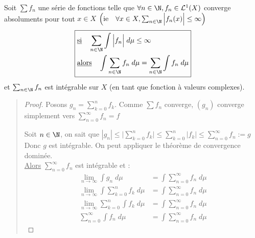 \begin{theorem}
    Soit $ \sum f_n$ une série de fonctions telle que $ \forall n \in \N, f_n \in \mathcal{L}^1(X)$ converge absoluments pour tout $x \in X$
    $ \Big( \text{ie} \quad \forall x \in X, \sum_{n \in \N} \Big| f_n (x) \Big| \le \infty \Big)$
    \[ \boxed{
    \begin{aligned}
        & \text{\underline{si}} \quad  \sum_{n \in \N} \int \Big| f_n \Big| \; d \mu \le \infty \\
        & \text{\underline{alors}} \quad \int \sum_{n \in \N} f_n \; d \mu = \sum_{n \in \N} \int f_n \; d \mu 
    \end{aligned} }
    \]
    et $\sum_{n \in \N} f_n$ est intégrable sur $X$ (en tant que fonction à valeurs complexes).
\end{theorem}

\begin{quote}
\footnotesize
\begin{proof}
    Posons $g_n = \sum_{k=0}^{n} f_k$. Comme $\sum f_n$ converge, $(g_n)$ converge simplement vers $\sum_{n=0}^{\infty} f_n = f $

    Soit $n \in \N$, on sait que $ |g_n| \leq \Big| \sum_{k=0}^{n} f_k \Big| \leq \sum_{k=0}^{n} | f_k | \leq \sum_{n=0}^{\infty} f_n := g $
    Donc $g$ est intégrable. On peut appliquer le théorème de convergence dominée. \\
    \underline{Alors} $ \sum_{n=0}^{\infty} f_n$ est intégrable et :
    \begin{align*}
        \lim_{n \to \infty} \int g_n \; d \mu &= \int \sum_{n=0}^{\infty} f_n \; d \mu \\
        \lim_{n\to\infty} \int \sum_{k=0}^{n} f_k \; d \mu &= \int \sum_{n=0}^{\infty} f_n \; d \mu \\
        \lim_{n\to\infty} \sum_{k=0}^{n} \int f_k \; d \mu &= \int \sum_{n=0}^{\infty} f_n \; d \mu \\
        \sum_{n=0}^{\infty} \int f_n \; d \mu &= \int \sum_{n=0}^{\infty} f_n \; d \mu 
    \end{align*}
\end{proof}
\normalsize
\end{quote}
